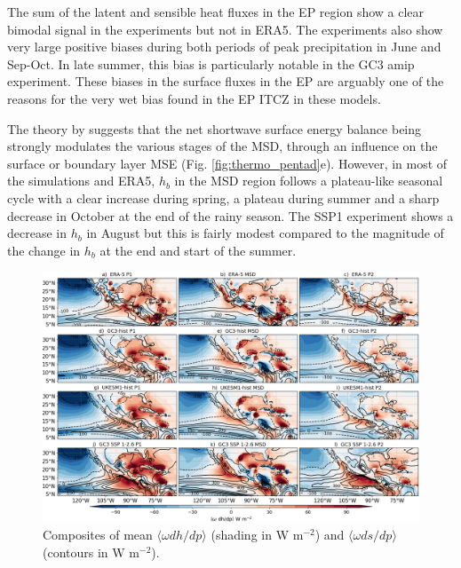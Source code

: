  The sum of the latent and sensible heat fluxes in the EP region show a clear bimodal signal in the experiments but not in ERA5. The experiments also show very large positive biases during both periods of peak precipitation in June and Sep-Oct. In late summer, this bias is particularly notable in the GC3 amip experiment. These biases in the surface fluxes in the EP are arguably one of the reasons for the very wet bias found in the EP ITCZ in these models. 
 
The theory by \cite{karnauskas2013} suggests that the net shortwave surface energy balance being strongly modulates the various stages of the MSD, through an influence on the surface or boundary layer MSE (Fig. \ref{fig:thermo_pentad}e). However, in most of the simulations and ERA5, $h_b$ in the MSD region follows a plateau-like seasonal cycle with a clear increase during spring, a plateau during summer and a sharp decrease in October at the end of the rainy season. The SSP1 experiment shows a  decrease in $h_b$ in August but this is fairly modest compared to the magnitude of the change in $h_b$ at the end and start of the summer. 
 
 
\begin{figure}[t!]
\includegraphics[width=\linewidth]{figures/thermocompositewdhdp.png}
\caption[Composites of the mean vertical advection of the MSE budget]{Composites of mean $\langle \omega dh/dp \rangle$ (shading in W m$^{-2}$) and $\langle \omega ds/dp \rangle$ (contours in W m$^{-2}$).  }
\label{fig:wdhdpcompo}
\end{figure}   
 
